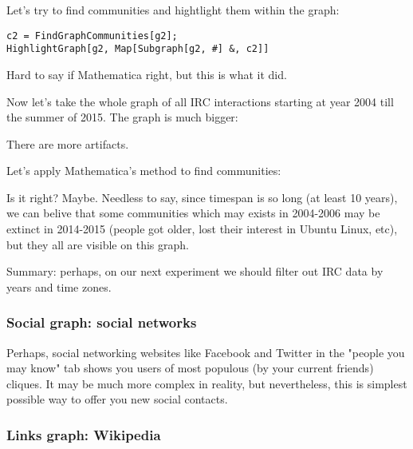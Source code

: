 Let's try to find communities and hightlight them within the graph:

\begin{lstlisting}
c2 = FindGraphCommunities[g2];
HighlightGraph[g2, Map[Subgraph[g2, #] &, c2]]
\end{lstlisting}

\begin{figure}[H]
\centering
{}
\end{figure}

Hard to say if Mathematica right, but this is what it did.

Now let's take the whole graph of all IRC interactions starting at year 2004 till the summer of 2015.
The graph is much bigger:

\begin{figure}[H]
\centering
{}
\end{figure}

There are more artifacts.

Let's apply Mathematica's method to find communities:

\begin{figure}[H]
\centering
{}
\end{figure}

Is it right? Maybe. Needless to say, since timespan is so long (at least 10 years), we can belive that some communities which may exists in 2004-2006 may be
extinct in 2014-2015 (people got older, lost their interest in Ubuntu Linux, etc), but they all are visible on this graph.

Summary: perhaps, on our next experiment we should filter out IRC data by years and time zones.

\subsubsection{Social graph: social networks}

Perhaps, social networking websites like Facebook and Twitter in the "people you may know" tab shows you users of most populous (by your current friends) cliques.
It may be much more complex in reality, but nevertheless, this is simplest possible way to offer you new social contacts.

\subsubsection{Links graph: Wikipedia}

